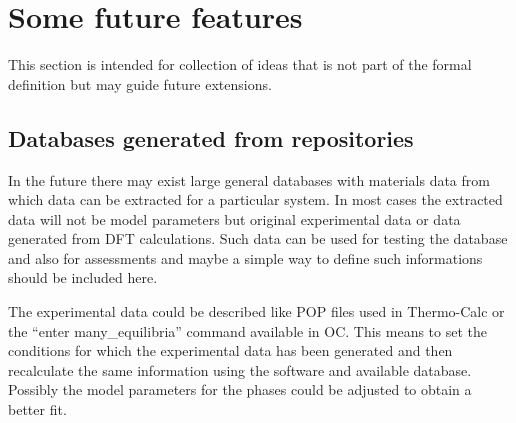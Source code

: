 \documentclass[12pt]{article}
\begin{document}
\section{Some future features}

This section is intended for collection of ideas that is not part of
the formal definition but may guide future extensions.

\subsection{Databases generated from repositories}

In the future there may exist large general databases with materials
data from which data can be extracted for a particular system.  In
most cases the extracted data will not be model parameters but
original experimental data or data generated from DFT calculations.
Such data can be used for testing the database and also for
assessments and maybe a simple way to define such informations should
be included here.

The experimental data could be described like POP files used in
Thermo-Calc or the ``enter many\_equilibria'' command available in OC.
This means to set the conditions for which the experimental data has
been generated and then recalculate the same information using the
software and available database.  Possibly the model parameters for
the phases could be adjusted to obtain a better fit.
\end{document}
